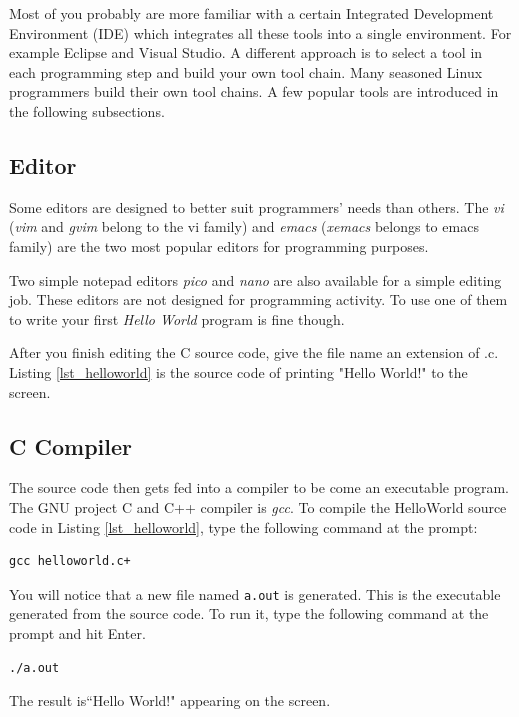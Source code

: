 Most of you probably are more familiar with a certain Integrated Development Environment (IDE) which integrates all these tools into a single environment. For example Eclipse and Visual Studio. A different approach is to select a tool in each programming step and build your own tool chain. Many seasoned Linux programmers build their own tool chains. A few popular tools are introduced in the following subsections.

\subsection{Editor}

Some editors are designed to better suit programmers' needs than others. The {\em vi} ({\em vim} and {\em gvim} belong to the vi family) and {\em emacs} ({\em xemacs} belongs to emacs family) are the two most popular editors for programming purposes.


Two simple notepad editors {\em pico} and {\em nano} are also available for a simple editing job. These editors are not designed for programming activity. To use one of them to write your first {\em Hello World} program is fine though. 

After you finish editing the C source code, give the file name an extension of .c. Listing \ref{lst_helloworld} is the source code of printing "Hello World!" to the screen. 



\subsection{C Compiler}
The source code then gets fed into a compiler to be come an executable program.
The GNU project C and C++ compiler is {\em gcc}. To compile the HelloWorld source code in Listing \ref{lst_helloworld}, type the following command at the prompt:
\begin{lstlisting}[style=bash]
gcc helloworld.c+ 
\end{lstlisting}
You will notice that a new file named \verb+a.out+ is generated.
This is the executable generated from the source code. To run it, type the following command at the prompt and hit Enter.
\begin{lstlisting}[style=bash]
./a.out
\end{lstlisting}
The result is``Hello World!" appearing on the screen.

